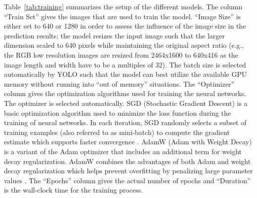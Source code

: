 \documentclass[Master,MDS,english]{BASE/twbook} %
\begin{document}
Table~\ref{tab:training} summarizes the setup of the different models. The column ``Train Set'' gives the images that are used to train the model. ``Image Size'' is either set to 640 or 1280 in order to assess the influence of the image size in the prediction results; the model resizes the input image such that the larger dimension scaled to 640 pixels while maintaining the original aspect ratio (e.g., the RGB low resolution images are resized from 2464x1600 to 640x416 as the image length and width have to be a multiples of 32).
The batch size is selected automatically by YOLO such that the model can best utilize the available GPU memory without running into ``out of memory'' situations. The ``Optimizer'' column gives the optimization algorithms used for training the neural networks. The optimizer is selected automatically.  SGD (Stochastic Gradient Descent) is a basic optimization algorithm used to minimize the loss function during the training of neural networks. In each iteration, SGD randomly selects a subset of training examples (also referred to as mini-batch) to compute the gradient estimate which supports faster convergence \citep{bottou2010large}. AdamW (Adam with Weight Decay) is a variant of the Adam optimizer that includes an additional term for weight decay regularization. AdamW combines the advantages of both Adam and weight decay regularization which helps prevent overfitting by penalizing large parameter values \citep{kingma2014adam}. 
The ``Epochs'' column gives the actual number of epochs and ``Duration'' is the wall-clock time for the training process. 
 
\end{document}
